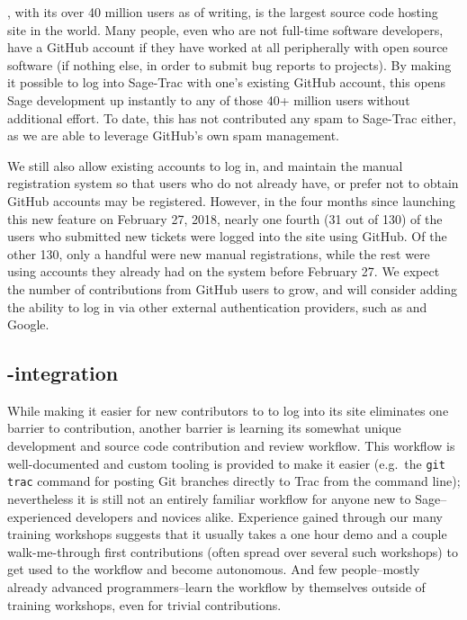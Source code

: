 \GitHub, with its over 40 million users as of writing, is the largest source
code hosting site in the world.  Many people, even who are not full-time
software developers, have a GitHub account if they have worked at all
peripherally with open source software (if nothing else, in order to submit bug
reports to projects).  By making it possible to log into Sage-Trac with one's
existing GitHub account, this opens Sage development up instantly to any of
those 40+ million users without additional effort.  To date, this has not
contributed any spam to Sage-Trac either, as we are able to leverage GitHub's
own spam management.

We still also allow existing accounts to log in, and maintain the manual
registration system so that users who do not already have, or prefer not to
obtain GitHub accounts may be registered.  However, in the four months since
launching this new feature on February 27, 2018, nearly one fourth (31 out of
130) of the users who submitted new tickets were logged into the site using
GitHub.  Of the other 130, only a handful were new manual registrations, while
the rest were using accounts they already had on the system before February 27.
We expect the number of contributions from GitHub users to grow, and will
consider adding the ability to log in via other external authentication
providers, such as \GitLab and Google.


\hypertarget{gitlab-trac-integration}{%
\subsection{\GitLab-\Trac integration}\label{gitlab-trac-integration}}

While making it easier for new contributors to \Sage to log into its \Trac site
eliminates one barrier to contribution, another barrier is learning its
somewhat unique development and source code contribution and review workflow.
This workflow is well-documented and custom tooling is provided to make it
easier (e.g.~the {\tt git trac} command for posting Git branches directly to
Trac from the command line); nevertheless it is still not an entirely familiar
workflow for anyone new to Sage--experienced developers and novices alike.
%
Experience gained through our many training workshops suggests that it usually
takes a one hour demo and a couple walk-me-through first contributions (often
spread over several such workshops) to get used to the workflow and become
autonomous. And few people--mostly already advanced programmers--learn the
workflow by themselves outside of training workshops, even for trivial
contributions.

